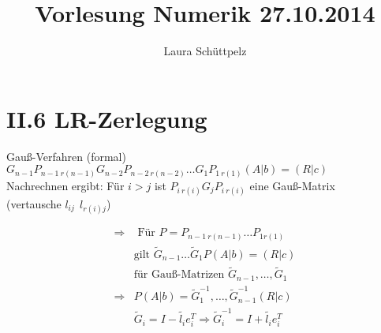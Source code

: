 \documentclass[a4paper]{scrartcl}
\title{Vorlesung Numerik 27.10.2014}
\author{Laura Schüttpelz}
\begin{document}
\maketitle

\section{II.6 LR-Zerlegung}
Gauß-Verfahren (formal) \\
$G_{n-1} P_{n-1~r(n-1)}G_{n-2}P_{n-2~r(n-2)} \dots G_1P_{1~r(1)}(A|b) = (R|c)$ \\
Nachrechnen ergibt: Für $i>j$ ist $P_{i~r(i)} G_jP_{i~r(i)}$ eine Gauß-Matrix \\
(vertausche $l_{ij} ~~ l_{r(i)j}$)

\begin{align*}
\Rightarrow &\text{ Für } P = P_{n-1~r(n-1)} \dots P_{1r(1)} \\
&\text{gilt } \widetilde{G}_{n-1} \dots \widetilde{G}_1 P (A|b) = (R|c) \\
&\text{für Gauß-Matrizen } \widetilde{G}_{n-1}, \dots, \widetilde{G}_1 \\
\Rightarrow &P (A|b) = \widetilde{G}_1^{-1}, \dots, \widetilde{G}_{n-1}^{-1} (R|c) \\
&\widetilde{G}_i = I - \widetilde{l_i} e_i^T \Rightarrow \widetilde{G}_i^{-1} = I + \widetilde{l_i} e_i^T\\
 \end{align*}
\end{document}
